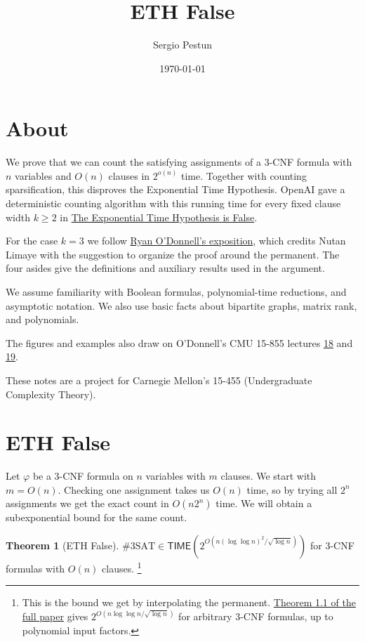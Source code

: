 \documentclass{article}
\title{ETH False}
\author{Sergio Pestun}
\date{\today}
\theoremstyle{definition}
\newtheorem{theorem}{Theorem}
\newcommand{\TIME}{\mathsf{TIME}}
\begin{document}
\maketitle

\section*{About}

We prove that we can count the satisfying assignments of a 3-CNF
formula with \(n\) variables and \(O(n)\) clauses in \(2^{o(n)}\) time.
Together with counting sparsification, this disproves the Exponential
Time Hypothesis. OpenAI gave a deterministic counting algorithm with
this running time for every fixed clause width \(k\ge 2\) in
\href{https://github.com/openai/math/blob/main/preprints/The-Exponential-Time-Hypothesis-is-False-October-25-2026/paper.pdf}{The Exponential Time Hypothesis is False}.

For the case \(k=3\) we follow
\href{https://www.cs.cmu.edu/~odonnell/some_eth_false_exposition.pdf}{Ryan O'Donnell's exposition},
which credits Nutan Limaye with the suggestion to organize the proof
around the permanent. The four asides give the definitions and auxiliary
results used in the argument.

We assume familiarity with Boolean formulas, polynomial-time reductions,
and asymptotic notation. We also use basic facts about bipartite graphs,
matrix rank, and polynomials.

The figures and examples also draw on O'Donnell's CMU 15-855 lectures
\href{https://www.youtube.com/watch?v=_HlQGMcQWhA&t=1848s}{18} and
\href{https://www.youtube.com/watch?v=3CdlC4XOrrs&t=4091s}{19}.

These notes are a project for Carnegie Mellon's
15-455 (Undergraduate Complexity Theory).

\section{ETH False}

Let \(\varphi\) be a 3-CNF formula on \(n\) variables with \(m\) clauses.
We start with \(m=O(n)\). Checking one assignment takes us \(O(n)\)
time, so by trying all \(2^n\) assignments we get the exact count in
\(O(n2^n)\) time. We will obtain a subexponential bound for the same count.

\begin{theorem}[ETH False]\label{thm:eth}
    \(\displaystyle
    \#\mathrm{3SAT}\in\TIME\!\left(2^{O\left(n(\log\log n)^2/\sqrt{\log n}\right)}\right)\)
    for 3-CNF formulas with \(O(n)\) clauses.%
    \footnote{This is the bound we get by interpolating the permanent.
    \href{https://github.com/openai/math/blob/main/preprints/The-Exponential-Time-Hypothesis-is-False-October-25-2026/paper.pdf}{Theorem 1.1 of the full paper} gives
    \(2^{O(n\log\log n/\sqrt{\log n})}\) for arbitrary 3-CNF formulas,
    up to polynomial input factors.}
\end{theorem}
\end{document}
